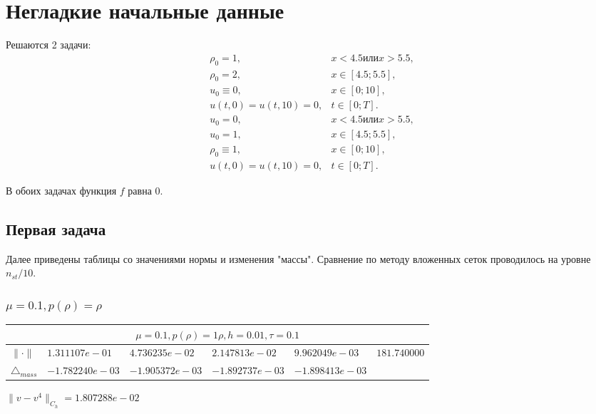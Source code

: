 \documentclass[12pt,a4paper]{article}
\begin{document}
\section{Негладкие начальные данные}

Решаются 2 задачи:
\begin{equation} \label{p1_1}
    \begin{array}{ll}
        \rho_0 = 1, & x < 4.5 \text{или} x > 5.5, \\
        \rho_0 = 2, & x \in [4.5; 5.5], \\
        u_0 \equiv 0, & x \in [0;10],\\
        u(t,0) = u(t, 10) = 0, & t \in [0; T].
    \end{array}
\end{equation}
\begin{equation} \label{p1_2}
    \begin{array}{ll}
        u_0 = 0, & x < 4.5 \text{или} x > 5.5, \\
        u_0 = 1, & x \in [4.5; 5.5], \\
        \rho_0 \equiv 1, & x \in [0;10],\\
        u(t,0) = u(t, 10) = 0, & t \in [0; T].
    \end{array}
\end{equation}

В обоих задачах функция $f$ равна 0.
\subsection{Первая задача}
Далее приведены таблицы со значениями нормы и изменения "массы". Сравнение по методу вложенных сеток проводилось на уровне $n_{st}/10$.
\subsubsection{$\mu = 0.1, p(\rho) = \rho $}
\begin{tabular}{*{6}{|l}|}
    \hline
     \\
    \hline
$\|\cdot \|$& $1.311107e-01$ & $4.736235e-02$ & $2.147813e-02$ & $9.962049e-03$ &$181.740000$\\
\hline
$\triangle_{mass}$& $-1.782240e-03$ & $-1.905372e-03$ & $-1.892737e-03$ & $-1.898413e-03$ &\\
\hline

\end{tabular}

$\|v-v^{4}\|_{C_h} = 1.807288e-02$
\end{document}
